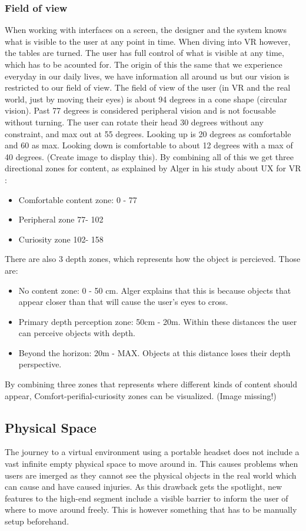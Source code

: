 \subsubsection{Field of view}
When working with interfaces on a screen, the designer and the system knows what is visible to the user at any point in time. When diving into VR however, the tables are turned. The user has full control of what is visible at any time, which has to be acounted for. The origin of this the same that we experience everyday in our daily lives, we have information all around us but our vision is restricted to our field of view. The field of view of the user (in VR and the real world, just by moving their eyes) is about 94 degrees in a cone shape (circular vision). Past 77 degrees is considered peripheral vision and is not focusable without turning. The user can rotate their head 30 degrees without any constraint, and max out at 55 degrees. Looking up is 20 degrees as comfortable and 60 as max. Looking down is comfortable to about 12 degrees with a max of 40 degrees. (Create image to display this). By combining all of this we get three directional zones for content, as explained by Alger in his study about UX for VR \cite{UX:Alger2015}:
\begin{itemize}
  \item Comfortable content zone: 0 - 77\degree
  \item Peripheral zone 77\degree - 102\degree
  \item Curiosity zone 102\degree - 158\degree
\end{itemize}
There are also 3 depth zones, which represents how the object is percieved. Those are:
\begin{itemize}
\item No content zone: 0 - 50 cm. Alger explains that this is because objects that appear closer than that will cause the user's eyes to cross.
\item Primary depth perception zone: 50cm - 20m. Within these distances the user can perceive objects with depth.
\item Beyond the horizon: 20m - MAX. Objects at this distance loses their depth perspective.
\end{itemize}
By combining three zones that represents where different kinds of content should appear,  Comfort-perifial-curiosity zones can be visualized. \cite{UX:Alger2015} (Image missing!)
\subsection{Physical Space}
The journey to a virtual environment using a portable headset does not include a vast infinite empty physical space to move around in. This causes problems when users are imerged as they cannot see the physical objects in the real world which can cause and have caused injuries.\cite{VR_injuries:2_allen_2017,VR_injuries:steamed} As this drawback gets the spotlight, new features to the high-end segment include a visible barrier to inform the user of where to move around freely. This is however something that has to be manually setup beforehand.\cite{VR_injuries:6_machkovech_2017}
